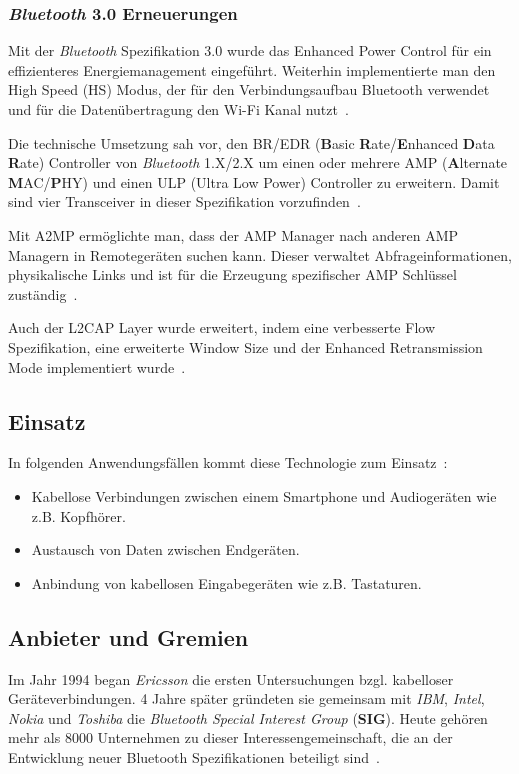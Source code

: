 \begin{multicols}{3}
\subsubsection*{\textit{Bluetooth} 3.0 Erneuerungen}
Mit der \textit{Bluetooth} Spezifikation 3.0 wurde das Enhanced Power Control für ein effizienteres Energiemanagement eingeführt. Weiterhin implementierte man den High Speed (HS) Modus, der für den Verbindungsaufbau Bluetooth verwendet und für die Datenübertragung den Wi-Fi Kanal nutzt~\cite{bluetooth3.0.1}.

Die technische Umsetzung sah vor, den BR/EDR (\textbf{B}asic \textbf{R}ate/\textbf{E}nhanced \textbf{D}ata \textbf{R}ate) Controller von \textit{Bluetooth} 1.X/2.X um einen oder mehrere AMP (\textbf{A}lternate \textbf{M}AC/\textbf{P}HY) und einen ULP (Ultra Low Power) Controller zu erweitern. Damit sind vier Transceiver in dieser Spezifikation vorzufinden~\cite{bluetooth3.0.2}.

Mit A2MP ermöglichte man, dass der AMP Manager nach anderen AMP Managern in Remotegeräten suchen kann. Dieser verwaltet Abfrageinformationen, physikalische Links und ist für die Erzeugung spezifischer AMP Schlüssel zuständig~\cite{bluetooth3.0.2}.

Auch der L2CAP Layer wurde erweitert, indem eine verbesserte Flow Spezifikation, eine erweiterte Window Size und der Enhanced Retransmission Mode implementiert wurde~\cite{bluetooth3.0.2}.

\subsection*{Einsatz}
In folgenden Anwendungsfällen kommt diese Technologie zum Einsatz~\cite{bluetooth3.0.1}:
\begin{itemize}
	\item Kabellose Verbindungen zwischen einem Smartphone und Audiogeräten wie z.B. Kopfhörer. 
	\item Austausch von Daten zwischen Endgeräten.
	\item Anbindung von kabellosen Eingabegeräten wie z.B. Tastaturen.
\end{itemize}

\subsection*{Anbieter und Gremien}
Im Jahr 1994 began \textit{Ericsson} die ersten Untersuchungen bzgl. kabelloser Geräteverbindungen. 4 Jahre später gründeten sie gemeinsam mit \textit{IBM}, \textit{Intel}, \textit{Nokia} und \textit{Toshiba} die \textit{Bluetooth Special Interest Group} (\textbf{SIG}). Heute gehören mehr als 8000 Unternehmen zu dieser Interessengemeinschaft, die an der Entwicklung neuer Bluetooth Spezifikationen beteiligt sind~\cite{bluetooth3.0.5}.


\end{multicols}
